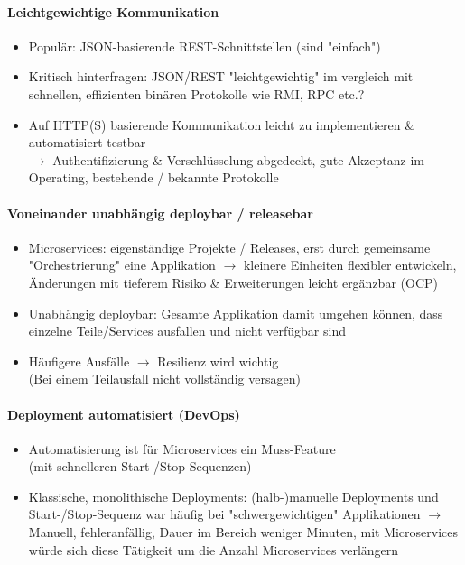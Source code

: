 \documentclass[a4paper]{article}
\begin{document}
				\paragraph{Leichtgewichtige Kommunikation}
				
					\begin{itemize}
						\item Populär: JSON-basierende REST-Schnittstellen (sind "einfach")
						\item Kritisch hinterfragen: JSON/REST "leichtgewichtig" im vergleich mit schnellen, effizienten binären Protokolle wie RMI, RPC etc.?
						\item Auf HTTP(S) basierende Kommunikation leicht zu implementieren \& automatisiert testbar\\
						$\rightarrow$ Authentifizierung \& Verschlüsselung abgedeckt, gute Akzeptanz im Operating, bestehende / bekannte Protokolle
					\end{itemize}
				
				\paragraph{Voneinander unabhängig deploybar / releasebar}
				
					\begin{itemize}
						\item Microservices: eigenständige Projekte / Releases, erst durch gemeinsame "Orchestrierung" eine Applikation $\rightarrow$ kleinere Einheiten flexibler entwickeln, Änderungen mit tieferem Risiko \& Erweiterungen leicht ergänzbar (OCP)
						\item Unabhängig deploybar: Gesamte Applikation damit umgehen können, dass einzelne Teile/Services ausfallen und nicht verfügbar sind
						\item Häufigere Ausfälle $\rightarrow$ Resilienz wird wichtig\\
						(Bei einem Teilausfall nicht vollständig versagen)
					\end{itemize}
				
				\paragraph{Deployment automatisiert (DevOps)}
				
					\begin{itemize}
						\item Automatisierung ist für Microservices ein Muss-Feature\\
								(mit schnelleren Start-/Stop-Sequenzen)
								
						\item Klassische, monolithische Deployments: (halb-)manuelle Deployments und Start-/Stop-Sequenz war häufig bei "schwergewichtigen" Applikationen $\rightarrow$ Manuell, fehleranfällig, Dauer im Bereich weniger Minuten, mit Microservices würde sich diese Tätigkeit um die Anzahl Microservices verlängern
					\end{itemize}
				
\end{document}

